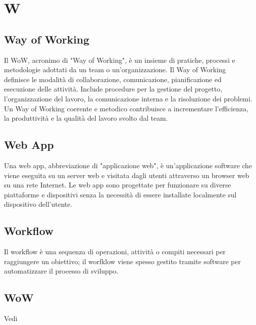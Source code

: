 \section{W}

\vspace{2em}
\subsection*{Way of Working}
\par Il WoW, acronimo di "Way of Working", è un insieme di pratiche, processi e metodologie adottati da un team o un'organizzazione. Il Way of Working definisce le modalità di collaborazione, comunicazione, pianificazione ed esecuzione delle attività. Include procedure per la gestione del progetto, l'organizzazione del lavoro, la comunicazione interna e la risoluzione dei problemi. Un Way of Working coerente e metodico contribuisce a incrementare l'efficienza, la produttività e la qualità del lavoro svolto dal team.

\vspace{2em}
\subsection*{Web App}
\par Una web app, abbreviazione di "applicazione web", è un'applicazione software che viene eseguita su un server web e visitata dagli utenti attraverso un browser web su una rete Internet. Le web app sono progettate per funzionare su diverse piattaforme e dispositivi senza la necessità di essere installate localmente sul dispositivo dell'utente.

\vspace{2em}
\subsection*{Workflow}
\par Il workflow è una sequenza di operazioni, attività o compiti necessari per raggiungere un obiettivo; il worfklow viene spesso gestito tramite software per automatizzare il processo di sviluppo.

\vspace{2em}
\subsection*{WoW}
\par Vedi 
